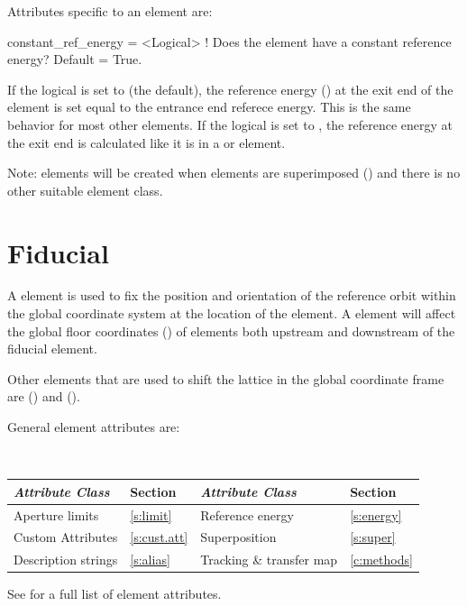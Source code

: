Attributes specific to an  element are:
\begin{example}
  constant_ref_energy = <Logical> ! Does the element have a constant reference energy? Default = True.
\end{example}

If the  logical is set to  (the default), the reference energy
() at the exit end of the element is set equal to the entrance end referece
energy. This is the same behavior for most other elements. If the  logical
is set to , the reference energy at the exit end is calculated like it is in a
 or  element.

Note:  elements will be created when elements are superimposed () and there is
no other suitable element class.

\section{Fiducial}
\label{s:fiducial}

A  element is used to fix the position and orientation of the reference orbit within
the global coordinate system at the location of the  element. A  element
will affect the global floor coordinates () of elements both upstream and downstream
of the fiducial element.

Other elements that are used to shift the lattice in the global coordinate frame are
 () and  ().

General  element attributes are:
\begin{center}
\tt
\begin{tabular}{llll} \toprule
  {\sl Attribute Class}      & Section           & {\sl Attribute Class}      & Section         \\ \midrule
  Aperture limits            & \ref{s:limit}     & Reference energy           & \ref{s:energy}  \\
  Custom Attributes          & \ref{s:cust.att}  & Superposition              & \ref{s:super}   \\
  Description strings        & \ref{s:alias}     & Tracking \& transfer map   & \ref{c:methods} \\ 
  \bottomrule
\end{tabular}
\end{center}
\toffset
See  for a full list of element attributes.

